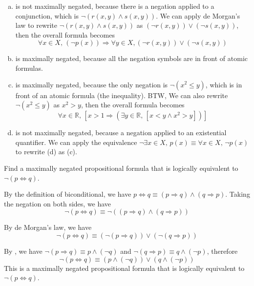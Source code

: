 \begin{solutions*}
    \fixlistskip
    \begin{enumerate}[(a)]
    \item is not maximally negated, because there is a negation applied to a conjunction, which is $\neg (r(x,y) \wedge s(x,y))$. We can apply de Morgan's law to rewrite $\neg (r(x,y) \wedge s(x,y))$ as $(\neg r(x,y)) \vee (\neg s(x,y))$, then the overall formula becomes
    \[\forall x \in X,\, (\neg p(x)) \Rightarrow \forall y \in X, (\neg r(x,y))\vee (\neg s(x,y))\]

    \item is maximally negated, because all the negation symbols are in front of atomic formulas.

    \item is maximally negated, because the only negation is $\neg (x^2 \le y)$, which is in front of an atomic formula (the inequality). BTW, We can also rewrite $\neg (x^2 \le y)$ as $x^2 > y$, then the overall formula becomes
    \[\forall x \in \mathbb{R},\, [x > 1 \Rightarrow (\exists y \in \mathbb{R},\, [x < y \wedge x^2 > y])]\]

    \item is not maximally negated, because a negation applied to an existential quantifier. We can apply the equivalence $\neg \exists x \in X,\, p(x) \equiv \forall x \in X,\, \neg p(x)$ to rewrite (d) as (c).
    \end{enumerate}
\end{solutions*}


\begin{exercise}
Find a maximally negated propositional formula that is logically equivalent to $\neg (p \Leftrightarrow q)$.
\end{exercise}

\begin{solutions*}
    By the definition of biconditional, we have $p \Leftrightarrow q \equiv (p \Rightarrow q) \wedge (q \Rightarrow p)$. Taking the negation on both sides, we have
    \[\neg (p \Leftrightarrow q) \equiv \neg ((p \Rightarrow q) \wedge (q \Rightarrow p))\]

    By de Morgan's law, we have
    \[\neg (p \Leftrightarrow q) \equiv (\neg (p \Rightarrow q)) \vee (\neg (q \Rightarrow p))\]

    By , we have $\neg (p \Rightarrow q) \equiv p \wedge (\neg q)$ and $\neg (q \Rightarrow p) \equiv q \wedge (\neg p)$, therefore
    \[\neg (p \Leftrightarrow q) \equiv (p \wedge (\neg q)) \vee (q \wedge (\neg p))\]
    This is a maximally negated propositional formula that is logically equivalent to $\neg (p \Leftrightarrow q)$.
\end{solutions*}

